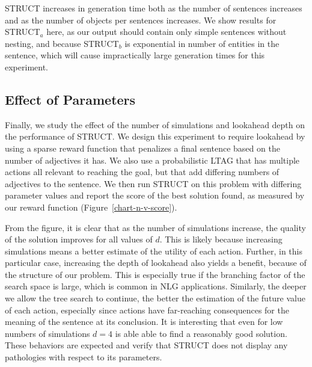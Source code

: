 STRUCT increases in generation time both as the number of sentences increases and as
the number of objects per sentences increases.  We show results for STRUCT$_a$ here,
as our output should contain only simple sentences without nesting, and because
STRUCT$_b$ is exponential in number of entities in the sentence, which will cause
impractically large generation times for this experiment.

\subsection{Effect of Parameters}
Finally, we study the effect of the number of simulations and
lookahead depth on the performance of STRUCT. We design this
experiment to require lookahead by using  a sparse
reward function that penalizes a final sentence based on the number of
adjectives it has. We also use a probabilistic LTAG that has multiple
actions all relevant to reaching the goal, but that add differing
numbers of adjectives to the sentence. We then run STRUCT on this
problem with differing parameter values and report the score of the
best solution found, as measured by our reward function
(Figure~\ref{chart-n-v-score}). 

From the figure, it is clear that as the number of simulations
increase, the quality of the solution improves for all values of $d$.
This is likely because increasing simulations means a better estimate
of the utility of each action. Further, in this particular case,
increasing the depth of lookahead also yields a benefit, because of
the structure of our problem. This is especially true if the branching
factor of the search space is large, which is common in NLG
applications.  Similarly, the deeper we allow the tree search to continue, the
better the estimation of the future value of each action,
especially since actions have far-reaching consequences for the
meaning of the sentence at its conclusion. 
It is interesting that even for low numbers of
simulations $d=4$ is able able to find a reasonably good
solution. These behaviors are expected and verify 
that STRUCT does not display any pathologies with respect to its parameters.